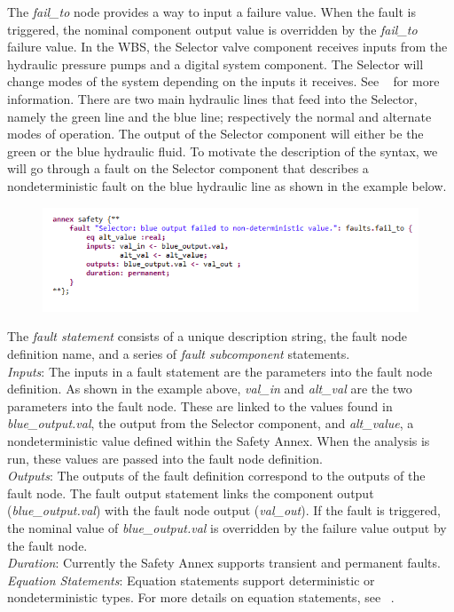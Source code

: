 The \textit{fail\_to} node provides a way to input a failure value. When the fault is triggered, the nominal component output value is overridden by the \textit{fail\_to} failure value. In the WBS, the Selector valve component receives inputs from the hydraulic pressure pumps and a digital system component. The Selector will change modes of the system depending on the inputs it receives. See ~\cite{AIR6110,Stewart17:IMBSA} for more information. There are two main hydraulic lines that feed into the Selector, namely the green line and the blue line; respectively the normal and alternate modes of operation. The output of the Selector component will either be the green or the blue hydraulic fluid. To motivate the description of the syntax, we will go through a fault on the Selector component that describes a nondeterministic fault on the blue hydraulic line as shown in the example below.
\begin{figure}[h!]
\vspace{-0.17in}
\begin{center}
\includegraphics[trim=0 15 0 11,clip,width=1.0\textwidth]{images/annex.png}
\end{center}
\vspace{-0.40in}
\end{figure}

The \textit{fault statement} consists of a unique description string, the fault node definition name, and a series of \textit{fault subcomponent} statements. \\
\textit{Inputs}: The inputs in a fault statement are the parameters into the fault node definition. As shown in the example above, \textit{val\_in} and \textit{alt\_val} are the two parameters into the fault node. These are linked to the values found in \textit{blue\_output.val}, the output from the Selector component, and \textit{alt\_value}, a nondeterministic value defined within the Safety Annex. When the analysis is run, these values are passed into the fault node definition.\\
\textit{Outputs}: The outputs of the fault definition correspond to the outputs of the fault node. The fault output statement links the component output (\textit{blue\_output.val}) with the fault node output (\textit{val\_out}). If the fault is triggered, the nominal value of \textit{blue\_output.val} is overridden by the failure value output by the fault node.\\
\textit{Duration}: Currently the Safety Annex supports transient and permanent faults.\\
\textit{Equation Statements}: Equation statements support deterministic or nondeterministic types. For more details on equation statements, see ~\cite{NFM2012:CoGaMiWhLaLu}.





